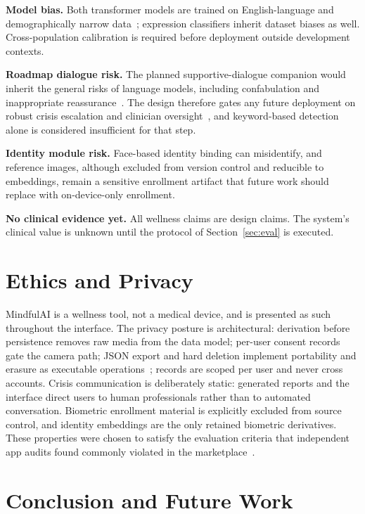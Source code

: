 \documentclass[11pt,a4paper]{article}
\newcommand{\system}{MindfulAI}
\begin{document}
\textbf{Model bias.} Both transformer models are trained on English-language and demographically narrow data~\cite{hartmann2023,demszky2020}; expression classifiers inherit dataset biases as well. Cross-population calibration is required before deployment outside development contexts.

\textbf{Roadmap dialogue risk.} The planned supportive-dialogue companion would inherit the general risks of language models, including confabulation and inappropriate reassurance~\cite{ayers2023}. The design therefore gates any future deployment on robust crisis escalation and clinician oversight~\cite{abdalrazaq2020}, and keyword-based detection alone is considered insufficient for that step.

\textbf{Identity module risk.} Face-based identity binding can misidentify, and reference images, although excluded from version control and reducible to embeddings, remain a sensitive enrollment artifact that future work should replace with on-device-only enrollment.

\textbf{No clinical evidence yet.} All wellness claims are design claims. The system's clinical value is unknown until the protocol of Section~\ref{sec:eval} is executed.

\section{Ethics and Privacy}\label{sec:ethics}

\system{} is a wellness tool, not a medical device, and is presented as such throughout the interface. The privacy posture is architectural: derivation before persistence removes raw media from the data model; per-user consent records gate the camera path; JSON export and hard deletion implement portability and erasure as executable operations~\cite{gdpr2016}; records are scoped per user and never cross accounts. Crisis communication is deliberately static: generated reports and the interface direct users to human professionals rather than to automated conversation. Biometric enrollment material is explicitly excluded from source control, and identity embeddings are the only retained biometric derivatives. These properties were chosen to satisfy the evaluation criteria that independent app audits found commonly violated in the marketplace~\cite{lagan2020}.

\section{Conclusion and Future Work}\label{sec:conclusion}
\end{document}
